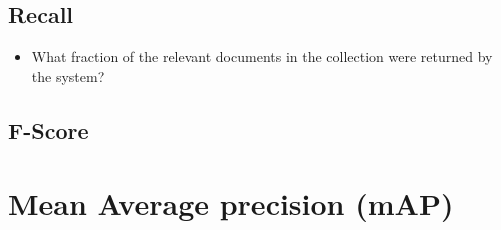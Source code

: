 \subsection{Recall}
\begin{itemize}
    \item What fraction of the relevant documents in the collection were returned by the system? \cite{ir-1}
\end{itemize}

\subsection{F-Score}


\section{Mean Average precision (mAP)}\label{Mean Average precision (mAP)}


















































